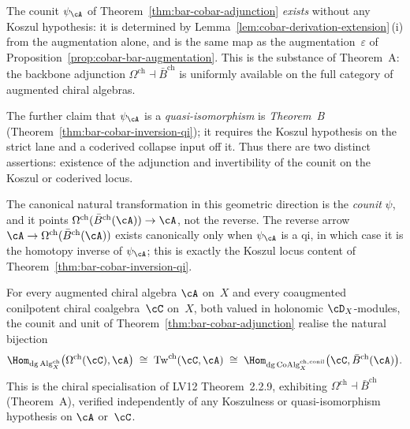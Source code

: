 \begin{remark}
\label{rem:eta-adjunction-vs-qi-scope}
%
%
The counit $\psi_{\cA}$ of Theorem~\ref{thm:bar-cobar-adjunction} \emph{exists}
without any Koszul hypothesis: it is determined by
Lemma~\ref{lem:cobar-derivation-extension}\,(i) from the augmentation alone,
and is the same map as the augmentation~$\varepsilon$ of
Proposition~\ref{prop:cobar-bar-augmentation}. This is the substance of
Theorem~A: the backbone adjunction
$\Omega^{\mathrm{ch}} \dashv \bar{B}^{\mathrm{ch}}$ is uniformly available
on the full category of augmented chiral algebras.

The further claim that $\psi_{\cA}$ is a \emph{quasi-isomorphism} is
\emph{Theorem~B} \textup{(}Theorem~\ref{thm:bar-cobar-inversion-qi}\textup{)};
it requires the Koszul hypothesis on the strict lane and a coderived
collapse input off it. Thus there are two distinct assertions:
existence of the adjunction and invertibility of the counit on the
Koszul or coderived locus.

The canonical natural transformation in this geometric direction is
the \emph{counit} $\psi$, and it points
$\Omega^{\mathrm{ch}}(\bar{B}^{\mathrm{ch}}(\cA)) \to \cA$, not the reverse.
The reverse arrow $\cA \to \Omega^{\mathrm{ch}}(\bar{B}^{\mathrm{ch}}(\cA))$
exists canonically only when $\psi_{\cA}$ is a qi, in which case it
is the homotopy inverse of $\psi_{\cA}$; this is exactly the Koszul
locus content of Theorem~\ref{thm:bar-cobar-inversion-qi}.
\end{remark}

\begin{corollary}
\label{cor:chiral-adjunction-hom-bijection}
For every augmented chiral algebra $\cA$ on~$X$ and every coaugmented
conilpotent chiral coalgebra~$\cC$ on~$X$, both valued in holonomic
$\cD_X$-modules, the counit and unit of
Theorem~\ref{thm:bar-cobar-adjunction} realise the natural bijection
\[
\Hom_{\mathrm{dg\,Alg}^{\mathrm{ch}}_X}\bigl(\Omega^{\mathrm{ch}}(\cC), \cA\bigr)
\;\cong\;
\mathrm{Tw}^{\mathrm{ch}}(\cC, \cA)
\;\cong\;
\Hom_{\mathrm{dg\,CoAlg}^{\mathrm{ch,conil}}_X}\bigl(\cC, \bar{B}^{\mathrm{ch}}(\cA)\bigr).
\]
This is the chiral specialisation of LV12 Theorem~2.2.9, exhibiting
$\Omega^{\mathrm{ch}} \dashv \bar{B}^{\mathrm{ch}}$ \textup{(}Theorem~A\textup{)}, verified independently of any Koszulness or
quasi-isomorphism hypothesis on $\cA$ or~$\cC$.
\end{corollary}

